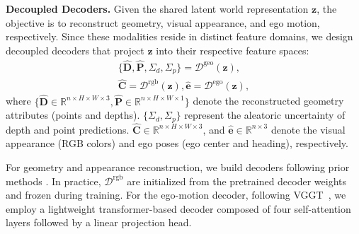 \noindent\textbf{Decoupled Decoders.}
Given the shared latent world representation $\mathbf{z}$, the objective is to reconstruct geometry, visual appearance, and ego motion, respectively. Since these modalities reside in distinct feature domains, we design decoupled decoders that project $\textbf{z}$ into their respective feature spaces:
\begin{equation}
\begin{aligned}
    \{\hat{\textbf{D}}, \hat{\textbf{P}},\Sigma_{d},\Sigma_{p}  \} =\mathcal{D}^{\text{geo}}(\textbf{z}), \\
    \hat{\textbf{C}} = \mathcal{D}^{\text{rgb}}(\textbf{z}), \hat{\textbf{e}}=\mathcal{D}^{\text{ego}}(\textbf{z}),
\end{aligned}
\end{equation}
where $\{\hat{\textbf{D}} \in \mathbb{R}^{n\times H \times W \times 3},\hat{\textbf{P}} \in \mathbb{R}^{n\times H \times W \times 1}\}$ denote the reconstructed geometry attributes (points and depths). $\{\Sigma_d, \Sigma_p\}$ represent the aleatoric uncertainty \cite{kendall2016modelling, novotny2018capturing} of depth and point predictions. $\hat{\textbf{C}} \in \mathbb{R}^{n \times H \times W \times 3}$, and $\hat{\textbf{e}} \in \mathbb{R}^{n \times 3}$ denote the visual appearance (RGB colors) and ego poses (ego center and heading), respectively. 

For geometry and appearance reconstruction, we build decoders following prior methods \cite{dcae, rae}. In practice, $\mathcal{D}^{\text{rgb}}$ are initialized from the pretrained decoder weights \cite{dcae, rae} and frozen during training. For the ego-motion decoder, following VGGT~\cite{vggt}, we employ a lightweight transformer-based decoder composed of four self-attention layers followed by a linear projection head.


